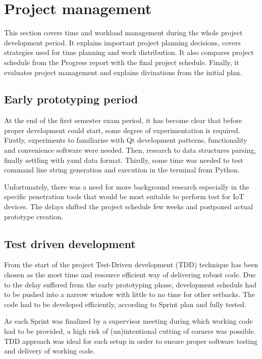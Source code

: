 \section{Project management} \label{project-man}
This section covers time and workload management during the whole project development period. It explains important project planning decisions, covers strategies used for time planning and work distribution. It also compares project schedule from the Progress report with the final project schedule. Finally, it evaluates project management and explains divinations from the initial plan.

\subsection{Early prototyping period}
	At the end of the first semester exam period, it has become clear that before proper development could start, some degree of experimentation is required. Firstly, experiments to familiarise with Qt development patterns, functionality and convenience software were needed. Then, research to data structures parsing, finally settling with yaml data format. Thirdly, some time was needed to test command line string generation and execution in the terminal from Python.
	
	Unfortunately, there was a need for more background research especially in the specific penetration tools that would be most suitable to perform test for IoT devices. The delays shifted the project schedule few weeks and postponed actual prototype creation. 
	
	\subsection{Test driven development}
	From the start of the project Test-Driven development (TDD) technique has been chosen as the most time and resource efficient way of delivering robust code. Due to the delay suffered from the early prototyping phase, development schedule had to be pushed into a narrow window with little to no time for other setbacks. The code had to be developed efficiently, according to Sprint plan and fully tested. 
	
	As each Sprint was finalized by a supervisor meeting during which working code had to be provided, a high risk of (un)intentional cutting of corners was possible. TDD approach was ideal for such setup in order to ensure proper software testing and delivery of working code.
	

